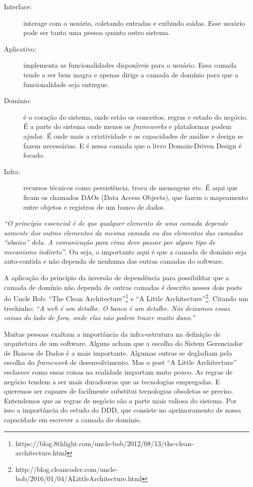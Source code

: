 \documentclass[a4paper, 12pt]{article}
\newcommand{\citacao}[1]{\emph{``#1''}}
\begin{document}
\begin{description}
\item [Interface:] interage com o usuário, coletando entradas e exibindo saídas. Esse usuário pode ser tanto uma pessoa quanto outro sistema.
\item [Aplicativo:] implementa as funcionalidades disponíveis para o usuário. Essa camada tende a ser bem magra e apenas dirige a camada de domínio para que a funcionalidade seja entregue.
\item [Domínio:] é o coração do sistema, onde estão os conceitos, regras e estado do negócio. É a parte do sistema onde menos os \emph{frameworks} e plataformas podem ajudar. É onde mais a criatividade e as capacidades de análise e design se fazem necessárias. E é nessa camada que o livro Domain-Driven Design é focado.
\item [Infra:] recursos técnicos como persistência, troca de mensagens etc. É aqui que ficam os chamados DAOs (Data Access Objects), que fazem o mapeamento entre objetos e registros de um banco de dados.
\end{description}

\citacao{O princípio essencial é de que qualquer elemento de uma camada depende somente dos outros elementos da mesma camada ou dos elementos das camadas ``abaixo'' dela. A comunicação para cima deve passar por algum tipo de mecanismo indireto}. Ou seja, o importante aqui é que a camada de domínio seja auto-contida e não dependa de nenhuma das outras camadas do software.

A aplicação do princípio da inversão de dependência para possibilitar que a camada de domínio não dependa de outras camadas é descrito nesses dois posts do Uncle Bob: ``The Clean Architecture''\footnote{https://blog.8thlight.com/uncle-bob/2012/08/13/the-clean-architecture.html} e ``A Little Architecture''\footnote{http://blog.cleancoder.com/uncle-bob/2016/01/04/ALittleArchitecture.html}. Citando um trechinho: \citacao{A web é um detalhe. O banco é um detalhe. Nós deixamos essas coisas do lado de fora, onde elas não podem trazer muito dano.}

Muitas pessoas exaltam a importância da infra-estrutura na definição de arquitetura de um software. Alguns acham que a escolha do Sistem Gerenciador de Bancos de Dados é a mais importante. Algumas outras se degladiam pela escolha do \emph{framework} de desenvolvimento. Mas o post ``A Little Architecture'' esclarece como essas coisas na realidade importam muto pouco. As regras de negócio tendem a ser mais duradouras que as tecnologias empregadas. E queremos ser capazes de facilmente substitui tecnologias obsoletas se preciso. Entendemos que as regras de negócio são a parte mais valiosa do sistema. Por isso a importância do estudo do DDD, que consiste no aprimoramento de nossa capacidade em escrever a camada do domínio.
\end{document}
